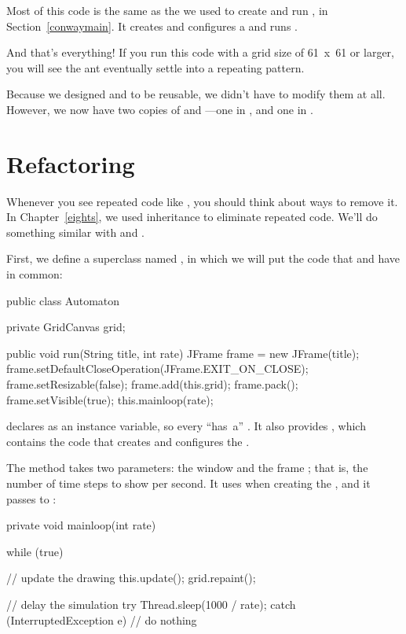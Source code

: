 Most of this code is the same as the  we used to create and run , in Section~\ref{conwaymain}.
It creates and configures a  and runs .

And that's everything!
If you run this code with a grid size of \mbox{61 x 61} or larger, you will see the ant eventually settle into a repeating pattern.

Because we designed  and  to be reusable, we didn't have to modify them at all.
However, we now have two copies of  and ---one in , and one in .


\section{Refactoring}
\label{refactor}

Whenever you see repeated code like , you should think about ways to remove it.
In Chapter~\ref{eights}, we used inheritance to eliminate repeated code.
We'll do something similar with  and .

First, we define a superclass named , in which we will put the code that  and  have in common:

\begin{code}
public class Automaton {
    private GridCanvas grid;

    public void run(String title, int rate) {
        JFrame frame = new JFrame(title);
        frame.setDefaultCloseOperation(JFrame.EXIT_ON_CLOSE);
        frame.setResizable(false);
        frame.add(this.grid);
        frame.pack();
        frame.setVisible(true);
        this.mainloop(rate);
    }
}
\end{code}

 declares  as an instance variable, so every  ``has~a'' .
It also provides , which contains the code that creates and configures the .

The  method takes two parameters: the window  and the frame ; that is, the number of time steps to show per second.
It uses  when creating the , and it passes  to :

\begin{code}
private void mainloop(int rate) {
    while (true) {

        // update the drawing
        this.update();
        grid.repaint();

        // delay the simulation
        try {
            Thread.sleep(1000 / rate);
        } catch (InterruptedException e) {
            // do nothing
        }
    }
}
\end{code}

